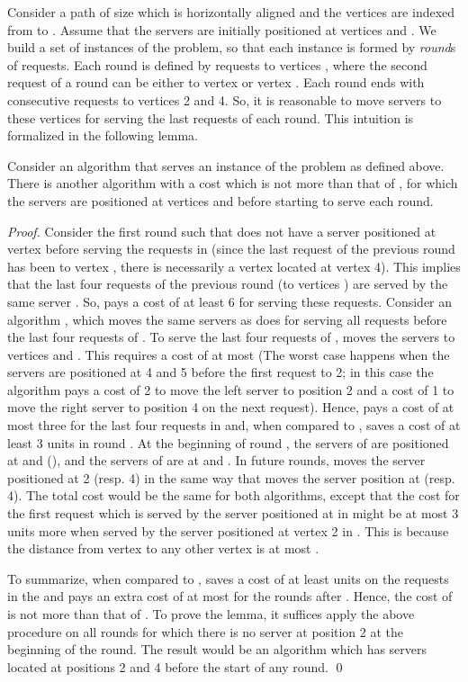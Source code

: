 Consider a path of size  which is horizontally aligned and the vertices are indexed from  to . Assume that the servers are initially positioned at vertices  and . We build a set of instances of the problem, so that each instance is formed by  \textit{round}s of requests. Each round is defined by requests to vertices , where the second request of a round can be either to vertex  or vertex . Each round ends with consecutive requests to vertices 2 and 4. So, it is reasonable to move servers to these vertices for serving the last requests of each round. This intuition is formalized in the following lemma.

\begin{lemma}
Consider an algorithm  that serves an instance of the problem as defined above. There is another algorithm  with a cost which is not more than that of , for which the servers are positioned at vertices  and  before starting to serve each round.
\end{lemma}

\begin{proof}
Consider the first round  such that  does not have a server positioned at vertex  before serving the requests in  (since the last request of the previous round has been to vertex , there is necessarily  a vertex located at vertex 4). This implies that the last four requests of the previous round  (to vertices ) are served by the same server . So,  pays a cost of at least 6 for serving these requests. Consider an algorithm , which moves the same servers as  does for serving all requests before the last four requests of . To serve the last four requests of ,  moves the servers to vertices  and . This requires a cost of at most  (The worst case happens when the servers are positioned at 4 and 5 before the first request to 2; in this case the algorithm pays a cost of 2 to move the left server to position 2 and a cost of 1 to move the right server to position 4 on the next request). Hence,  pays a cost of at most three for the last four requests in  and, when compared to , saves a cost of at least 3 units in round . At the beginning of round , the servers of  are positioned at  and  (), and the servers of  are at  and . 
In future rounds,  moves the server positioned at 2 (resp. 4) in the same way that  moves the server position at  (resp. 4). The total cost would be the same for both algorithms, except that the cost for the first request which is served by the server positioned at  in  might be at most 3 units more when served by the server positioned at vertex 2 in . This is because the distance from vertex  to any other vertex is at most .  

To summarize, when compared to ,  saves a cost of at least  units on the requests in the  and pays an extra cost of at most  for the rounds after . Hence, the cost of  is not more than that of . To prove the lemma, it suffices apply the above procedure on all rounds for which there is no server at position 2 at the beginning of the round. The result would be an algorithm which has servers located at positions 2 and 4 before the start of any round. \qed
\end{proof}

